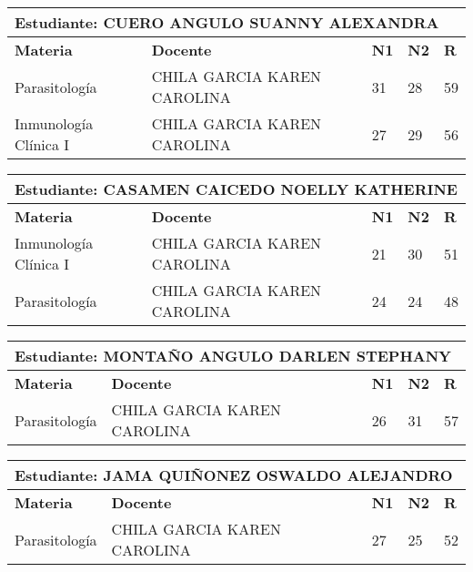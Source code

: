 \small
\begin{tabularx}{\textwidth}{|p{5cm}|p{7cm}|X|X|X|}
\hline
\multicolumn{5}{|p{\dimexpr\textwidth-2\tabcolsep-2\arrayrulewidth}|}{\textbf{Estudiante: CUERO ANGULO SUANNY ALEXANDRA }}\\\hline
\textbf{Materia} & \textbf{Docente} & \textbf{N1} & \textbf{N2} & \textbf{R} \\ \hline
Parasitología & CHILA GARCIA KAREN CAROLINA  & 31 & 28& 59 \\ \hline
Inmunología Clínica I & CHILA GARCIA KAREN CAROLINA  & 27 & 29& 56 \\ \hline
\end{tabularx}\vspace{10mm}
\small
\begin{tabularx}{\textwidth}{|p{5cm}|p{7cm}|X|X|X|}
\hline
\multicolumn{5}{|p{\dimexpr\textwidth-2\tabcolsep-2\arrayrulewidth}|}{\textbf{Estudiante: CASAMEN CAICEDO NOELLY KATHERINE }}\\\hline
\textbf{Materia} & \textbf{Docente} & \textbf{N1} & \textbf{N2} & \textbf{R} \\ \hline
Inmunología Clínica I & CHILA GARCIA KAREN CAROLINA  & 21 & 30& 51 \\ \hline
Parasitología & CHILA GARCIA KAREN CAROLINA  & 24 & 24& 48 \\ \hline
\end{tabularx}\vspace{10mm}
\small
\begin{tabularx}{\textwidth}{|p{5cm}|p{7cm}|X|X|X|}
\hline
\multicolumn{5}{|p{\dimexpr\textwidth-2\tabcolsep-2\arrayrulewidth}|}{\textbf{Estudiante: MONTAÑO ANGULO DARLEN STEPHANY }}\\\hline
\textbf{Materia} & \textbf{Docente} & \textbf{N1} & \textbf{N2} & \textbf{R} \\ \hline
Parasitología & CHILA GARCIA KAREN CAROLINA  & 26 & 31& 57 \\ \hline
\end{tabularx}\vspace{10mm}
\small
\begin{tabularx}{\textwidth}{|p{5cm}|p{7cm}|X|X|X|}
\hline
\multicolumn{5}{|p{\dimexpr\textwidth-2\tabcolsep-2\arrayrulewidth}|}{\textbf{Estudiante: JAMA QUIÑONEZ OSWALDO ALEJANDRO }}\\\hline
\textbf{Materia} & \textbf{Docente} & \textbf{N1} & \textbf{N2} & \textbf{R} \\ \hline
Parasitología & CHILA GARCIA KAREN CAROLINA  & 27 & 25& 52 \\ \hline
\end{tabularx}\vspace{10mm}
